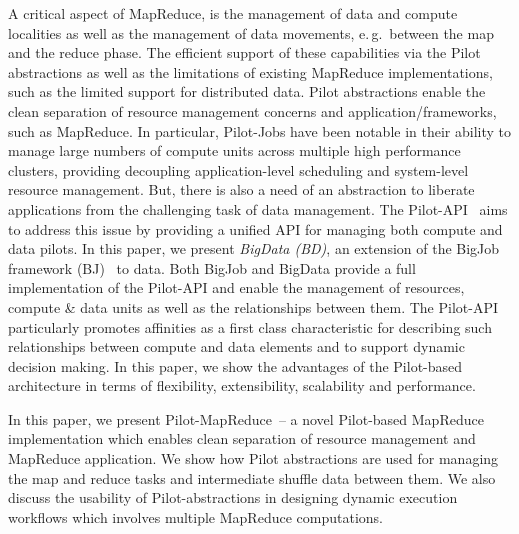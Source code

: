 \documentclass{acm_proc_article-sp}
\newcommand{\pilot}{Pilot\xspace}
\newcommand{\pilotjobs}{Pilot-Jobs\xspace}
\newcommand{\pilotmapreduce}{Pilot-MapReduce\xspace}
\begin{document}



A critical aspect of MapReduce, is the management of data and compute localities
as well as the management of data movements, e.\,g.\ between the map and the
reduce phase. The efficient support of these capabilities via the Pilot
abstractions as well as the limitations of existing MapReduce implementations,
such as the limited support for distributed data. Pilot abstractions enable the
clean separation of resource management concerns and application/frameworks,
such as MapReduce. In particular, \pilotjobs have been notable in their ability
to manage large numbers of compute units across multiple high performance
clusters, providing decoupling application-level scheduling and system-level
resource management. But, there is also a need of an abstraction to liberate
applications from the challenging task of data management. The
Pilot-API~\cite{pstar-2012} aims to address this issue by providing a unified
API for managing both compute and data pilots. In this paper, we present
\emph{BigData (BD)}, an extension of the BigJob framework (BJ)~\cite{bigjob_web}
to data. Both BigJob and BigData provide a full implementation of the Pilot-API
and enable the management of resources, compute \& data units as well as the
relationships between them. The Pilot-API particularly promotes affinities as a
first class characteristic for describing such relationships between compute and
data elements and to support dynamic decision making. In this paper, we show the
advantages of the \pilot-based architecture in terms of flexibility,
extensibility, scalability and performance.


In this paper, we present \pilotmapreduce \ -- a novel \pilot-based MapReduce
implementation which enables clean separation of resource management and
MapReduce application. We show how \pilot abstractions are used for managing the
map and reduce tasks and intermediate shuffle data between them. We also discuss
the usability of \pilot-abstractions in designing dynamic execution workflows
which involves multiple MapReduce computations.
\end{document}
